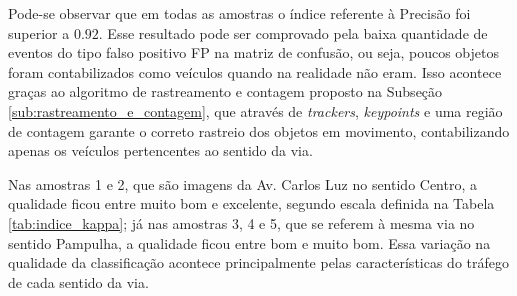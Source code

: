 \begin{table}[ht]
  \caption{Resultado obtido da contagem nas amostras de teste, índices de desempenho e índice Kappa (K).}
  \label{tab:matrix_result}
  \begin{center}
  \end{center}
\end{table}

Pode-se observar que em todas as amostras o índice referente à Precisão foi superior a $0.92$. Esse resultado pode ser comprovado pela baixa quantidade de eventos do tipo falso positivo FP na matriz de confusão, ou seja, poucos objetos foram contabilizados como veículos quando na realidade não eram. Isso acontece graças ao algoritmo de rastreamento e contagem proposto na Subseção \ref{sub:rastreamento_e_contagem}, que através de \textit{trackers}, \textit{keypoints} e uma região de contagem garante o correto rastreio dos objetos em movimento, contabilizando apenas os veículos pertencentes ao sentido da via.

Nas amostras 1 e 2, que são imagens da Av. Carlos Luz no sentido Centro, a qualidade ficou entre muito bom e excelente, segundo escala definida na Tabela \ref{tab:indice_kappa}; já  nas amostras 3, 4 e 5, que se referem à mesma via no sentido Pampulha, a qualidade ficou entre bom e muito bom. Essa variação na qualidade da classificação acontece principalmente pelas características do tráfego de cada sentido da via. 

